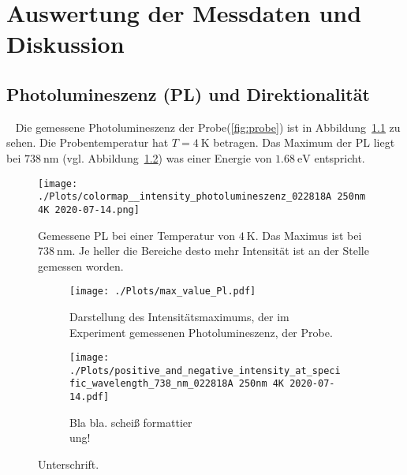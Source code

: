 \chapter{Auswertung der Messdaten und Diskussion}

\section{Photolumineszenz (PL) und Direktionalität}~\label{sec:PL_u_Direktionalitaet}
Die gemessene Photolumineszenz der Probe(\ref{fig:probe})
ist in Abbildung~\ref{fig:photo} zu sehen. Die Probentemperatur hat $T = \SI{4}{\kelvin}$ betragen.
Das Maximum der PL liegt bei $\SI{738}{\nano\meter}$ (vgl. Abbildung~\ref{fig:max})
was einer Energie von $\SI{1,68}{\eV}$ entspricht.
\begin{figure}
    \centering
    \texttt{[image: ./Plots/colormap\_\_intensity\_photolumineszenz\_022818A 250nm 4K 2020-07-14.png]}
    \caption{Gemessene PL bei einer Temperatur von $\SI{4}{\kelvin}$. 
    Das Maximus ist bei $\SI{738}{\nano\meter}$. 
    Je heller die Bereiche desto mehr Intensität ist an der Stelle gemessen worden.}
    \label{fig:photo}
\end{figure}
\FloatBarrier
\begin{figure}
    \begin{subfigure}{0.5\textwidth}
        \centering
        \texttt{[image: ./Plots/max\_value\_Pl.pdf]}
        \caption{Darstellung des Intensitätsmaximums, der im Experiment gemessenen Photolumineszenz, der Probe.}
        \label{fig:max}
    \end{subfigure}
    \begin{subfigure}{0.5\textwidth}
        \centering
        \texttt{[image: ./Plots/positive\_and\_negative\_intensity\_at\_specific\_wavelength\_738\_nm\_022818A 250nm 4K 2020-07-14.pdf]}
        \caption{Bla bla. scheiß formattier\\
        ung!}
        \label{fig:i_pn}
    \end{subfigure}
    \caption{Unterschrift.}
    \label{fig:rho}
\end{figure}
\FloatBarrier

